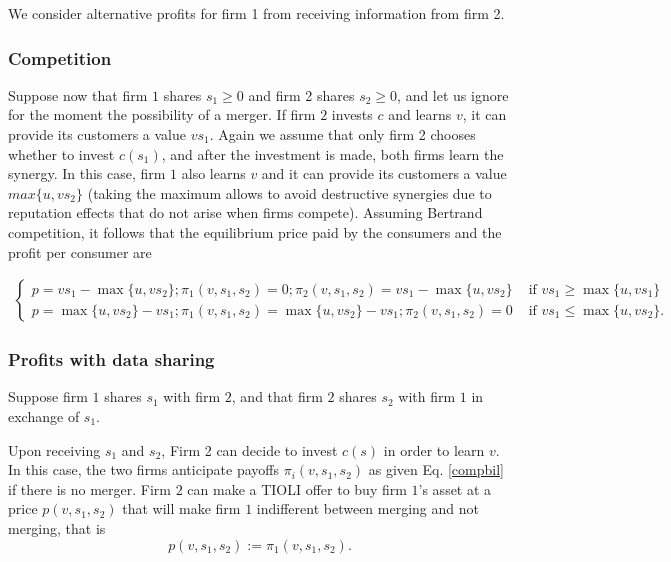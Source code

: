 \documentclass[a4paper,leqno]{article}%
\begin{document}
We consider alternative profits for firm 1 from receiving information from firm 2.

\subsubsection{Competition}

Suppose now that firm $1$ shares $s_1\geq 0$ and firm 2 shares $s_2\geq0$, and let us ignore for the moment the possibility of a merger. If firm $2$ invests $c$ and learns $v$, it can provide its customers a value $vs_1$. Again we assume that only firm 2 chooses whether to invest $c(s_1)$, and after the investment is made, both firms learn the synergy. In this case, firm $1$ also learns $v$ and it can provide its customers a value $max\{u,vs_2\}$ (taking the maximum allows to avoid destructive synergies due to reputation effects that do not arise when firms compete). Assuming Bertrand competition, it follows that the equilibrium price paid by the consumers and the profit per consumer are

\begin{align}\label{compbil}
\begin{cases}
    p=v s_1-\max\{u,v s_2\}; \pi_1(v,s_1,s_2)=0; \pi_2(v,s_1,s_2)=v s_1-\max\{u,v s_2\} & \text{ if }v s_1\geq \max\{u,v s_1\}\\ 
    p=\max\{u,v s_2\}-v s_1; \pi_1(v,s_1,s_2)=\max\{u,v s_2\}-v s_1; \pi_2(v,s_1,s_2)=0 & \text{ if }v s_1\leq \max\{u,v s_2\}.
\end{cases}
\end{align}


\subsubsection{Profits with data sharing}

Suppose firm $1$ shares $s_1$ with firm $2$, and that firm $2$ shares $s_2$ with firm $1$ in exchange of $s_1$. 

Upon receiving $s_1$ and $s_2$, Firm 2 can decide to invest $c(s)$ in order to learn $v$. In this case, the two firms anticipate payoffs $\pi_i(v, s_1,s_2)$ as given  Eq. \eqref{compbil} if there is no merger. Firm $2$ can make a TIOLI offer to buy firm $1$'s asset at a price $p(v, s_1,s_2)$ that will make firm $1$ indifferent between merging and not merging, that is 
%
\begin{equation}\label{merger-pricebil}
    p(v, s_1,s_2):=\pi_1(v, s_1,s_2).  
\end{equation}
\end{document}
